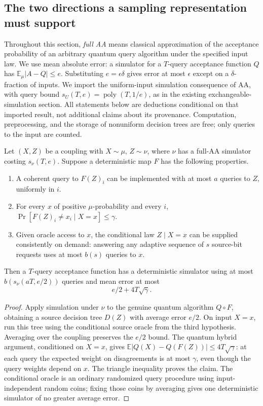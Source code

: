 \subsection{The two directions a sampling representation must support}
\label{sec:threshold-positive-transfer}

Throughout this section, \emph{full AA} means classical approximation of
the acceptance probability of an arbitrary quantum query algorithm under
the specified input law. We use mean absolute error: a simulator for a
\(T\)-query acceptance function \(Q\) has
\(\mathbb E_\mu|A-Q|\le e\). Substituting \(e=\epsilon\delta\) gives
error at most \(\epsilon\) except on a \(\delta\)-fraction of inputs.
We import the uniform-input simulation consequence of AA, with query
bound \(s_U(T,e)=\operatorname{poly}(T,1/e)\), as in the existing
exchangeable-simulation section. All statements below are deductions
conditional on that imported result, not additional claims about its
provenance. Computation, preprocessing, and the storage of nonuniform
decision trees are free; only queries to the input are counted.

\begin{proposition}
\label{prop:threshold-local-posterior}
Let \((X,Z)\) be a coupling with \(X\sim\mu\), \(Z\sim\nu\), where
\(\nu\) has a full-AA simulator costing \(s_\nu(T,e)\). Suppose a
deterministic map \(F\) has the following properties.
\begin{enumerate}
\item A coherent query to \(F(Z)_i\) can be implemented with at most
\(a\) queries to \(Z\), uniformly in \(i\).
\item For every \(x\) of positive \(\mu\)-probability and every \(i\),
\(\Pr[F(Z)_i\ne x_i\mid X=x]\le\gamma\).
\item Given oracle access to \(x\), the conditional law \(Z\mid X=x\)
can be supplied consistently on demand: answering any adaptive sequence
of \(s\) source-bit requests uses at most \(b(s)\) queries to \(x\).
\end{enumerate}
Then a \(T\)-query acceptance function has a deterministic simulator
using at most \(b(s_\nu(aT,e/2))\) queries and mean error at most
\[
 e/2+4T\sqrt\gamma.
\]
\end{proposition}

\begin{proof}
Apply simulation under \(\nu\) to the genuine quantum algorithm
\(Q\circ F\), obtaining a source decision tree \(D(Z)\) with average
error \(e/2\). On input \(X=x\), run this tree using the conditional
source oracle from the third hypothesis. Averaging over the coupling
preserves the \(e/2\) bound. The quantum hybrid argument, conditioned
on \(X=x\), gives
\(\mathbb E|Q(X)-Q(F(Z))|\le4T\sqrt\gamma\): at each query the
expected weight on disagreements is at most \(\gamma\), even though
the query weights depend on \(x\). The triangle inequality proves the
claim. The conditional oracle is an ordinary randomized query procedure
using input-independent random coins; fixing those coins by averaging
gives one deterministic simulator of no greater average error.
\end{proof}

